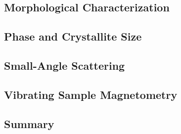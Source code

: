 \documentclass[\main/dresen_thesis.tex]{subfiles}
\renewcommand{\thisPath}{\main/chapters/looselyPackedNS/nanoparticles/}
\begin{document}

  \subsection{Morphological Characterization}
    
      \FloatBarrier

  \subsection{Phase and Crystallite Size}
    
      \FloatBarrier

  \subsection{Small-Angle Scattering}
    
      \FloatBarrier

  \subsection{Vibrating Sample Magnetometry}
    
      \FloatBarrier

  \clearpage
  \subsection{Summary}
    
      \FloatBarrier
\end{document}
